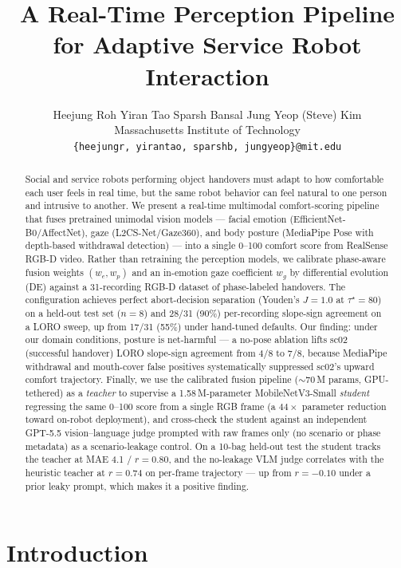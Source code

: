 \documentclass{article}
\title{A Real-Time Perception Pipeline for Adaptive Service Robot Interaction}
\author{%
  Heejung Roh \quad Yiran Tao \quad Sparsh Bansal \quad Jung Yeop (Steve) Kim \\
  Massachusetts Institute of Technology \\
  \texttt{\{heejungr, yirantao, sparshb, jungyeop\}@mit.edu}
}
\begin{document}
\maketitle

\begin{abstract}
Social and service robots performing object handovers must adapt to how comfortable each user feels in real time, but the same robot behavior can feel natural to one person and intrusive to another. We present a real-time multimodal comfort-scoring pipeline that fuses pretrained unimodal vision models --- facial emotion (EfficientNet-B0/AffectNet), gaze (L2CS-Net/Gaze360), and body posture (MediaPipe Pose with depth-based withdrawal detection) --- into a single 0--100 comfort score from RealSense RGB-D video. Rather than retraining the perception models, we calibrate phase-aware fusion weights $(w_e, w_p)$ and an in-emotion gaze coefficient $w_g$ by differential evolution (DE) against a 31-recording RGB-D dataset of phase-labeled handovers. The configuration achieves perfect abort-decision separation (Youden's $J = 1.0$ at $\tau^\star = 80$) on a held-out test set ($n=8$) and 28/31 (90\%) per-recording slope-sign agreement on a LORO sweep, up from 17/31 (55\%) under hand-tuned defaults. Our finding: under our domain conditions, posture is net-harmful --- a no-pose ablation lifts sc02 (successful handover) LORO slope-sign agreement from 4/8 to 7/8, because MediaPipe withdrawal and mouth-cover false positives systematically suppressed sc02's upward comfort trajectory. Finally, we use the calibrated fusion pipeline ($\sim$70\,M params, GPU-tethered) as a \emph{teacher} to supervise a 1.58\,M-parameter MobileNetV3-Small \emph{student} regressing the same 0--100 score from a single RGB frame (a $44\times$ parameter reduction toward on-robot deployment), and cross-check the student against an independent GPT-5.5 vision--language judge prompted with raw frames only (no scenario or phase metadata) as a scenario-leakage control. On a 10-bag held-out test the student tracks the teacher at MAE 4.1 / $r=0.80$, and the no-leakage VLM judge correlates with the heuristic teacher at $r=0.74$ on per-frame trajectory --- up from $r=-0.10$ under a prior leaky prompt, which makes it a positive finding. 
\end{abstract}

\section{Introduction}
\end{document}
